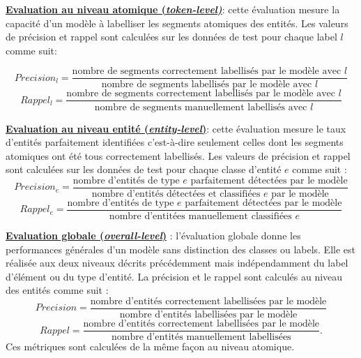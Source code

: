 \noindent \underline{\textbf{Evaluation au niveau atomique (\textit{token-level)}}}: cette évaluation mesure la capacité d'un modèle à labelliser les segments atomiques des entités. Les valeurs de précision et rappel sont calculées sur les données de test pour chaque label $l$ comme suit:

\[Precision_l = \frac{\text{nombre de segments correctement labellisés par le modèle avec } l} {\text{nombre de segments labellisés par le modèle avec } l}\]
\[Rappel_l = \frac{\text{nombre de segments correctement labellisés par le modèle avec } l} {\text{nombre de segments manuellement labellisés avec } l}\]

\vspace{0.3cm}

\noindent \underline{\textbf{Evaluation au niveau entité (\textit{entity-level})}}: cette évaluation mesure le taux d'entités parfaitement identifiées c'est-à-dire seulement celles dont les segments atomiques ont été tous correctement labellisés. Les valeurs de précision et rappel sont calculées sur les données de test pour chaque classe d'entité $e$ comme suit :
\[Precision_e = \frac{\text{nombre d'entités de type } e \text{ parfaitement détectées par le modèle}} {\text{nombre d'entités détectées et classifiées } e\text{ par le modèle}}\]
\[Rappel_e = \frac{\text{nombre d'entités de type } e \text{ parfaitement détectées par le modèle}} {\text{nombre d'entitées manuellement classifiées } e}\]

\vspace{0.3cm}

\noindent \underline{\textbf{Evaluation globale (\textit{overall-level})}} : l'évaluation globale donne les performances générales d'un modèle sans distinction des classes ou labels. Elle est réalisée aux deux niveaux décrits précédemment mais indépendamment du label d'élément ou du type d'entité. La précision et le rappel sont calculés au niveau des entités comme suit :
\[Precision = \frac{\text{nombre d'entités correctement labellisées par le modèle}} {\text{nombre d'entités labellisées par le modèle}}\]
\[Rappel = \frac{\text{nombre d'entités correctement labellisées par le modèle}} {\text{nombre d'entités  manuellement labellisées}}.\]
Ces métriques sont calculées de la même façon au niveau atomique.

